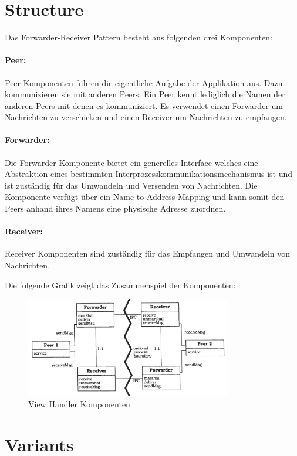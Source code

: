 \section{Structure}
Das Forwarder-Receiver Pattern besteht aus folgenden drei Komponenten:
\paragraph{Peer:} Peer Komponenten führen die eigentliche Aufgabe der Applikation aus. Dazu kommunizieren sie mit anderen Peers. Ein Peer kennt lediglich die Namen der anderen Peers mit denen es kommuniziert. Es verwendet einen Forwarder um Nachrichten zu verschicken und einen Receiver um Nachrichten zu empfangen.

\paragraph{Forwarder:} Die Forwarder Komponente bietet ein generelles Interface welches eine Abstraktion eines bestimmten Interprozesskommunikationsmechanismus ist und ist zuständig für das Umwandeln und Versenden von Nachrichten. Die Komponente verfügt über ein Name-to-Address-Mapping und kann somit den Peers anhand ihres Namens eine physische Adresse zuordnen.

\paragraph{Receiver:} Receiver Komponenten sind zuständig für das Empfangen und Umwandeln von Nachrichten.

\medskip
Die folgende Grafik zeigt das Zusammenspiel der Komponenten:
\begin{figure}[H]
	\centering
	\includegraphics[width=0.8\textwidth]{figures/11-forwarder-receiver-1.png}
	\caption{View Handler Komponenten}
\end{figure}


\section{Variants}


